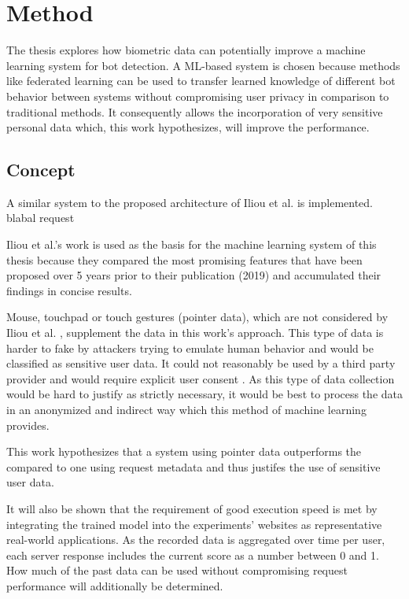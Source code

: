 \documentclass[
    fontsize=12pt,
    headings=small,
    parskip=half,           %
    bibliography=totoc,
    numbers=noenddot,       %
    open=any,               %
    final                   %
]{scrreprt}
\begin{document}
\chapter{Method}

The thesis explores how biometric data can potentially improve a machine learning system for bot detection. A ML-based system is chosen because methods like federated learning \cite{DBLP:journals/corr/KonecnyMR15} \cite{DBLP:journals/corr/KonecnyMRR16} can be used to transfer learned knowledge of different bot behavior between systems without compromising user privacy in comparison to traditional methods. It consequently allows the incorporation of very sensitive personal data which, this work hypothesizes, will improve the performance.


\section{Concept}

A similar system to the proposed architecture of Iliou et al. \cite{10.1145/3339252.3339267} is implemented. blabal request

Iliou et al.'s work is used as the basis for the machine learning system of this thesis because they compared the most promising features that have been proposed over 5 years prior to their publication (2019) and accumulated their findings in concise results.

Mouse, touchpad or touch gestures (pointer data), which are not considered by Iliou et al. \cite{10.1145/3339252.3339267}, supplement the data in this work's approach. This type of data is harder to fake by attackers trying to emulate human behavior and would be classified as sensitive user data. It could not reasonably be used by a third party provider and would require explicit user consent \cite{GDPR}. As this type of data collection would be hard to justify as strictly necessary, it would be best to process the data in an anonymized and indirect way which this method of machine learning provides.

This work hypothesizes that a system using pointer data outperforms the compared to one using request metadata and thus justifes the use of sensitive user data.

It will also be shown that the requirement of good execution speed is met by integrating the trained model into the experiments' websites as representative real-world applications. As the recorded data is aggregated over time per user, each server response includes the current score as a number between 0 and 1. How much of the past data can be used without compromising request performance will additionally be determined.
\end{document}
